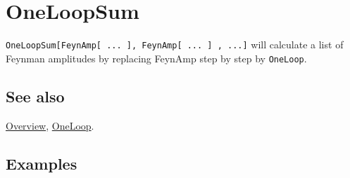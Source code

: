 \documentclass[../FeynCalcManual.tex]{subfiles}
\begin{document}
\hypertarget{oneloopsum}{%
\section{OneLoopSum}\label{oneloopsum}}

\texttt{OneLoopSum[\allowbreak{}FeynAmp[\allowbreak{} ... ],\ \allowbreak{}FeynAmp[\allowbreak{} ... ] ,\ \allowbreak{}...]}
will calculate a list of Feynman amplitudes by replacing FeynAmp step by
step by \texttt{OneLoop}.

\subsection{See also}

\hyperlink{toc}{Overview}, \hyperlink{oneloop}{OneLoop}.

\subsection{Examples}
\end{document}
